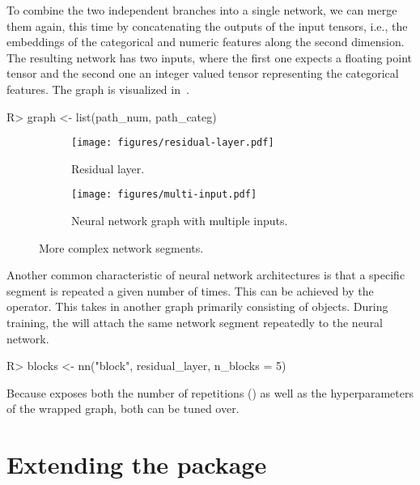 \documentclass[article]{jss}
\theoremstyle{definition}
\begin{document}
To combine the two independent branches into a single network, we can merge them again, this time by concatenating the outputs of the input tensors, i.e., the embeddings of the categorical and numeric features along the second dimension.
The resulting network has two inputs, where the first one expects a floating point tensor and the second one an integer valued tensor representing the categorical features.
The graph is visualized in~.

\begin{CodeInput}
R> graph <- list(path_num, path_categ) %
\end{CodeInput}

\begin{figure}[h]
    \centering
    \begin{subfigure}{0.38\textwidth}
        \centering
        \texttt{[image: figures/residual-layer.pdf]}
        \caption{Residual layer.}
        \label{fig:residual-layer}
    \end{subfigure}
    \hfill
    \begin{subfigure}{0.58\textwidth}
        \centering
        \texttt{[image: figures/multi-input.pdf]}
        \caption{Neural network graph with multiple inputs.}
        \label{fig:multi-inputs}
    \end{subfigure}
    \caption{More complex network segments.}
    \label{fig:side-by-side}
\end{figure}

Another common characteristic of neural network architectures is that a specific segment is repeated a given number of times.
This can be achieved by the  operator.
This  takes in another graph primarily consisting of  objects.
During training, the  will attach the same network segment repeatedly to the neural network.

\begin{CodeInput}
R> blocks <- nn("block", residual_layer, n_blocks = 5)
\end{CodeInput}

Because  exposes both the number of repetitions () as well as the hyperparameters of the wrapped graph, both can be tuned over.

\section{Extending the package}\label{sec:extending}
\end{document}

